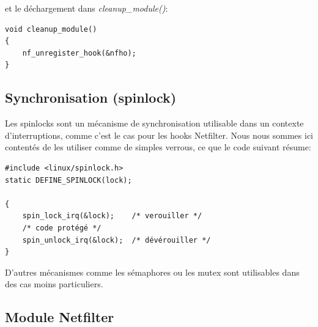\documentclass[a4paper]{article}
\begin{document}
et le déchargement dans \textit{cleanup\_module()}:
\begin{verbatim}
void cleanup_module()
{
    nf_unregister_hook(&nfho);
}
\end{verbatim}

\subsection{Synchronisation (spinlock)}
Les spinlocks sont un mécanisme de synchronisation utilisable
dans un contexte d'interruptions, comme c'est le cas pour les
hooks Netfilter. Nous nous sommes ici contentés de les utiliser
comme de simples verrous, ce que le code suivant résume:

\begin{verbatim}
#include <linux/spinlock.h>
static DEFINE_SPINLOCK(lock); 

{
    spin_lock_irq(&lock);    /* verouiller */
    /* code protégé */
    spin_unlock_irq(&lock);  /* dévérouiller */
}
\end{verbatim}

D'autres mécanismes comme les sémaphores ou les mutex sont
utilisables dans des cas moins particuliers.

\subsection{Module Netfilter}
\end{document}
